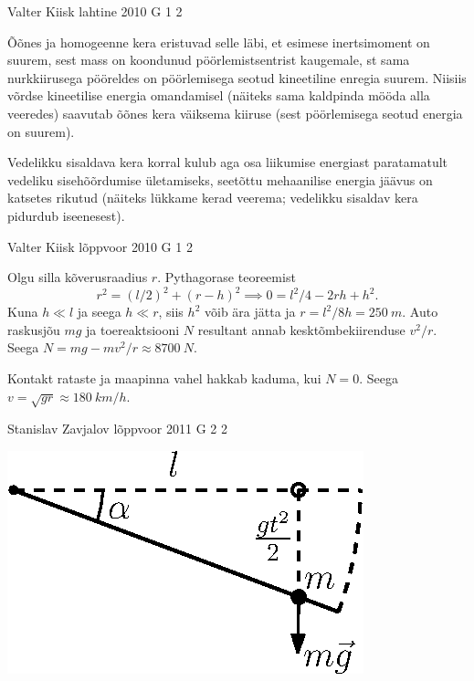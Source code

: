 \documentclass[11pt]{article}
\begin{document}
{%
{Valter Kiisk} %
{lahtine} %
{2010} %
{G 1} %
{2} %
{

\ifSolution
Õõnes ja homogeenne kera eristuvad selle läbi, et esimese inertsimoment on suurem, sest
mass on koondunud pöörlemistsentrist kaugemale, st sama nurkkiirusega pööreldes on pöörlemisega seotud kineetiline enregia suurem. 
Niisiis võrdse kineetilise energia omandamisel (näiteks sama kaldpinda mööda alla veeredes) saavutab 
õõnes kera väiksema kiiruse (sest pöörlemisega seotud energia on suurem). 

Vedelikku sisaldava kera korral kulub aga osa liikumise energiast paratamatult
vedeliku sisehõõrdumise ületamiseks, seetõttu mehaanilise energia jäävus on katsetes
rikutud (näiteks lükkame kerad veerema; vedelikku sisaldav kera pidurdub iseenesest).
\fi
}

{Valter Kiisk} %
{lõppvoor} %
{2010} %
{G 1} %
{2} %
{

\ifSolution
Olgu
silla kõverusraadius $r$. Pythagorase teoreemist
\[
r^2=(l/2)^2+(r-h)^2\implies 0=l^2/4-2rh+h^2.
\]
Kuna $h\ll l$ ja seega $h\ll r$, siis $h^2$ võib ära jätta ja $r=l^2/8h=\SI{250}{m}$.
Auto raskusjõu $mg$ ja toereaktsiooni $N$ resultant annab kesktõmbekiirenduse $v^2/r$.
Seega $N=mg-mv^2/r\approx\SI{8700}{N}$.

Kontakt rataste ja maapinna vahel hakkab kaduma, kui $N=0$. Seega $v=\sqrt{gr}\approx
\SI{180}{km/h}$.
\fi
}

{Stanislav Zavjalov} %
{lõppvoor} %
{2011} %
{G 2} %
{2} %
{

\ifSolution
\begin{center}
	\includegraphics[width = 0.5\linewidth]{2011-v3g-02-varras_lah.eps}
\end{center}

}}
\end{document}
